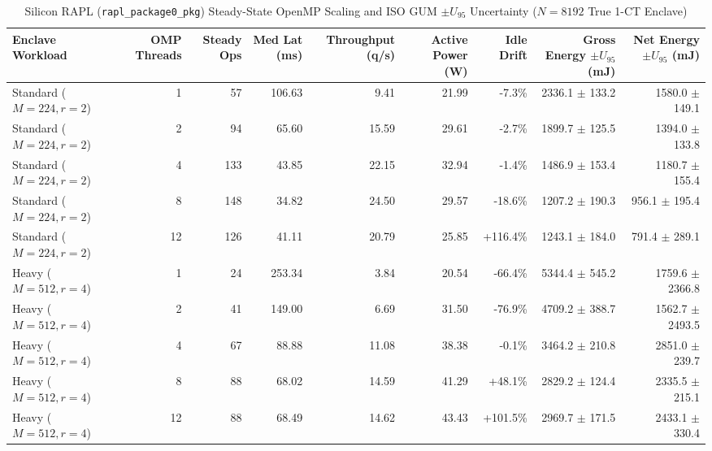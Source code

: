 \documentclass[10pt,journal,compsoc]{IEEEtran}
\begin{document}
\begin{table}[!t]
\centering
\caption{Silicon RAPL (\texttt{rapl\_package0\_pkg}) Steady-State OpenMP Scaling and ISO GUM $\pm U_{95}$ Uncertainty ($N=8192$ True 1-CT Enclave)}
\label{tab:rapl}
\footnotesize
\begin{adjustbox}{max width=\textwidth}
\begin{tabular}{lrrrrrrrr}
\toprule
\textbf{Enclave Workload} & \textbf{OMP Threads} & \textbf{Steady Ops} & \textbf{Med Lat (ms)} & \textbf{Throughput (q/s)} & \textbf{Active Power (W)} & \textbf{Idle Drift} & \textbf{Gross Energy $\pm U_{95}$ (mJ)} & \textbf{Net Energy $\pm U_{95}$ (mJ)} \\
\midrule
Standard ($M=224, r=2$) & 1 & 57 & 106.63 & 9.41 & 21.99 & -7.3\% & 2336.1 $\pm$ 133.2 & 1580.0 $\pm$ 149.1 \\
Standard ($M=224, r=2$) & 2 & 94 & 65.60 & 15.59 & 29.61 & -2.7\% & 1899.7 $\pm$ 125.5 & 1394.0 $\pm$ 133.8 \\
Standard ($M=224, r=2$) & 4 & 133 & 43.85 & 22.15 & 32.94 & -1.4\% & 1486.9 $\pm$ 153.4 & 1180.7 $\pm$ 155.4 \\
Standard ($M=224, r=2$) & 8 & 148 & 34.82 & 24.50 & 29.57 & -18.6\% & 1207.2 $\pm$ 190.3 & 956.1 $\pm$ 195.4 \\
Standard ($M=224, r=2$) & 12 & 126 & 41.11 & 20.79 & 25.85 & +116.4\% & 1243.1 $\pm$ 184.0 & 791.4 $\pm$ 289.1 \\
\midrule
Heavy ($M=512, r=4$) & 1 & 24 & 253.34 & 3.84 & 20.54 & -66.4\% & 5344.4 $\pm$ 545.2 & 1759.6 $\pm$ 2366.8 \\
Heavy ($M=512, r=4$) & 2 & 41 & 149.00 & 6.69 & 31.50 & -76.9\% & 4709.2 $\pm$ 388.7 & 1562.7 $\pm$ 2493.5 \\
Heavy ($M=512, r=4$) & 4 & 67 & 88.88 & 11.08 & 38.38 & -0.1\% & 3464.2 $\pm$ 210.8 & 2851.0 $\pm$ 239.7 \\
Heavy ($M=512, r=4$) & 8 & 88 & 68.02 & 14.59 & 41.29 & +48.1\% & 2829.2 $\pm$ 124.4 & 2335.5 $\pm$ 215.1 \\
Heavy ($M=512, r=4$) & 12 & 88 & 68.49 & 14.62 & 43.43 & +101.5\% & 2969.7 $\pm$ 171.5 & 2433.1 $\pm$ 330.4 \\
\bottomrule
\end{tabular}
\end{adjustbox}
\end{table}
\end{document}
